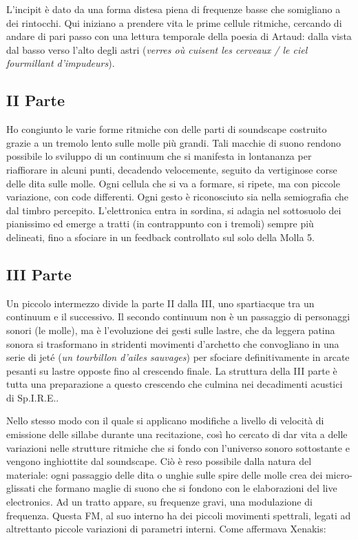 L'incipit è dato da una forma distesa piena di frequenze basse che somigliano a dei rintocchi. Qui iniziano a prendere vita le prime cellule ritmiche, cercando di andare di pari passo con una lettura temporale della poesia di Artaud: dalla vista dal basso verso l'alto degli astri (\textit{verres où cuisent les cerveaux / le ciel fourmillant d'impudeurs}).


\subsection*{II Parte}

Ho congiunto le varie forme ritmiche con delle parti di soundscape costruito grazie a un tremolo lento sulle molle più grandi. Tali macchie di suono rendono possibile lo sviluppo di un continuum che si manifesta in lontananza per riaffiorare in alcuni punti, decadendo velocemente, seguito da vertiginose corse delle dita sulle molle. Ogni cellula che si va a formare, si ripete, ma con piccole variazione, con code differenti. Ogni gesto è riconosciuto sia nella semiografia che dal timbro percepito. L'elettronica entra in sordina, si adagia nel sottosuolo dei pianissimo ed emerge a tratti (in contrappunto con i tremoli) sempre più delineati, fino a sfociare in un feedback controllato sul solo della Molla 5. 


\subsection*{III Parte}

Un piccolo intermezzo divide la parte II dalla III, uno spartiacque tra un continuum  e il successivo. Il secondo continuum non è un passaggio di personaggi sonori (le molle), ma è l'evoluzione dei gesti sulle lastre, che da leggera patina sonora si trasformano in stridenti movimenti d'archetto che convogliano in una serie di jeté (\textit{un tourbillon d'ailes sauvages}) per sfociare definitivamente in arcate pesanti su lastre opposte fino al crescendo finale. La struttura della III parte è tutta una preparazione a questo crescendo che culmina nei decadimenti acustici di Sp.I.R.E..


Nello stesso modo con il quale si applicano modifiche a livello di velocità di emissione delle sillabe durante una recitazione, così ho cercato di dar vita a delle variazioni nelle strutture ritmiche che si fondo con l'universo sonoro sottostante e vengono inghiottite dal soundscape. Ciò è reso possibile dalla natura del materiale: ogni passaggio delle dita o unghie sulle spire delle molle crea dei micro-glissati che formano maglie di suono che si fondono con le elaborazioni del live electronics. Ad un tratto appare, su frequenze gravi, una modulazione di frequenza. Questa FM, al suo interno ha dei piccoli movimenti spettrali, legati ad altrettanto piccole variazioni di parametri interni. Come affermava Xenakis:

